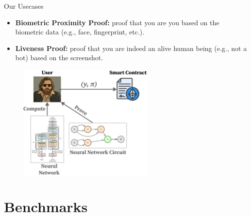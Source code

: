 \documentclass{zkdl-presentation-template}
\newcommand{\cmark}{\textcolor{green!65!black}{\ding{51}}}%
\begin{document}
    \begin{frame}{Our Usecases}
        \begin{itemize}[label=\cmark]
            \item \textbf{Biometric Proximity Proof:} proof that you are you based on the 
            biometric data (e.g., face, fingerprint, etc.).
            \item \textbf{Liveness Proof:} proof that you are indeed an alive human being
            (e.g., not a bot) based on the screenshot.
        \end{itemize}

        \begin{figure}
            \centering
            \includegraphics[width=0.6\textwidth]{images/client-side.pdf}
        \end{figure}
    \end{frame}

    \section{Benchmarks}
\end{document}
